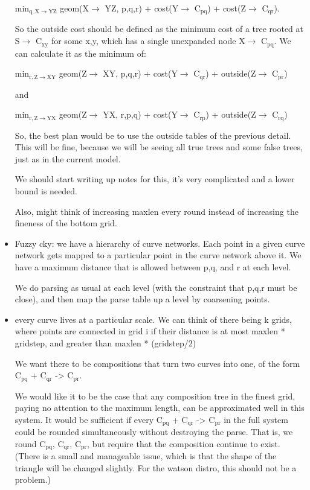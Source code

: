 \documentclass{book}
\begin{document}
\begin{itemize}
      min$_{\mathrm{q, X\to YZ}}$ geom(X$\to$ YZ, p,q,r) + cost(Y$\to$ C$_{\mathrm{pq}}$) +
      cost(Z$\to$ C$_{\mathrm{qr}}$).

    So the outside cost should be defined as the minimum cost of a
    tree rooted at S$\to$ C$_{\mathrm{xy}}$ for some x,y, which has a single
    unexpanded node X$\to$ C$_{\mathrm{pq}}$. We can calculate it as the minimum of:

      min$_{\mathrm{r, Z\to XY}}$ geom(Z$\to$ XY, p,q,r) + cost(Y$\to$ C$_{\mathrm{qr}}$) + 
      outside(Z$\to$ C$_{\mathrm{pr}}$)

    and

      min$_{\mathrm{r, Z\to YX}}$ geom(Z$\to$ YX, r,p,q) + cost(Y$\to$ C$_{\mathrm{rp}}$) + 
      outside(Z$\to$ C$_{\mathrm{rq}}$)

    So, the best plan would be to use the outside tables of the
    previous detail. This will be fine, because we will be seeing all
    true trees and some false trees, just as in the current model.

    We should start writing up notes for this, it's very complicated
    and a lower bound is needed.

    Also, might think of increasing maxlen every round instead of
    increasing the fineness of the bottom grid.
\item Fuzzy cky: we have a hierarchy of curve networks. Each point in a
    given curve network gets mapped to a particular point in the curve
    network above it. We have a maximum distance that is allowed
    between p,q, and r at each level.

    We do parsing as usual at each level (with the constraint that
    p,q,r must be close), and then map the parse table up a level by
    coarsening points.
\item every curve lives at a particular scale. We can think of there
    being k grids, where points are connected in grid i if their
    distance is at most maxlen * gridstep, and greater than maxlen *
    (gridstep/2)

    We want there to be compositions that turn two curves into one, of
    the form C$_{\mathrm{pq}}$ + C$_{\mathrm{qr}}$ -> C$_{\mathrm{pr}}$.

    We would like it to be the case that any composition tree in the
    finest grid, paying no attention to the maximum length, can be
    approximated well in this system. It would be sufficient if every
    C$_{\mathrm{pq}}$ + C$_{\mathrm{qr}}$ -> C$_{\mathrm{pr}}$ in the full system could be rounded
    simultaneously without destroying the parse. That is, we round
    C$_{\mathrm{pq}}$, C$_{\mathrm{qr}}$, C$_{\mathrm{pr}}$, but require that the composition continue to
    exist. (There is a small and manageable issue, which is that the
    shape of the triangle will be changed slightly. For the watson
    distro, this should not be a problem.)


\end{itemize}
\end{document}
